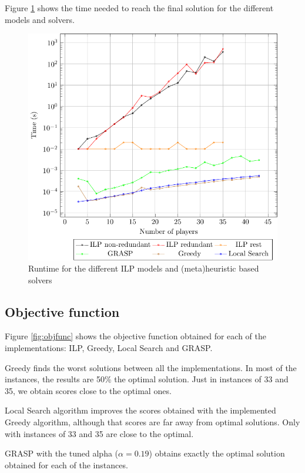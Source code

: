 \documentclass[a4paper, 10pt]{article}
\begin{document}
Figure \ref{fig:time} shows the time needed to reach the final solution for the different models and solvers.
\begin{figure}[H]
    \includegraphics[width=\linewidth]{plots/times.pdf}
    \caption{Runtime for the different ILP models and (meta)heuristic based solvers}
    \label{fig:time}
\end{figure}


\clearpage
\subsection{Objective function}

Figure \ref{fig:objfunc} shows the objective function obtained for each of the implementations: ILP, Greedy, Local Search and GRASP. 

Greedy finds the worst solutions between all the implementations. In most of the instances, the results are 50\% the optimal solution. Just in instances of 33 and 35, we obtain scores close to the optimal ones.

Local Search algorithm improves the scores obtained with the implemented Greedy algorithm, although that scores are far away from optimal solutions. Only with instances of 33 and 35 are close to the optimal.

GRASP with the tuned alpha ($\alpha = 0.19$) obtains exactly the optimal solution obtained for each of the instances.
\end{document}
